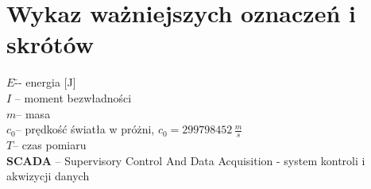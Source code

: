 ﻿\chapter*{Wykaz ważniejszych oznaczeń i skrótów}
\begin{tabbing}
  $E$\tab[1cm] \=-- energia [J]\\
  $I$			\>-- moment bezwładności\\
  $m$\>-- masa\\
  $c_0$\>-- prędkość światła w próżni, $c_0 = 299798452\,\frac{m}{s}$ \\
  $T$\>-- czas pomiaru\\
  \textbf{SCADA} \>-- Supervisory Control And Data Acquisition - system kontroli i akwizycji danych\\
  \end{tabbing}


